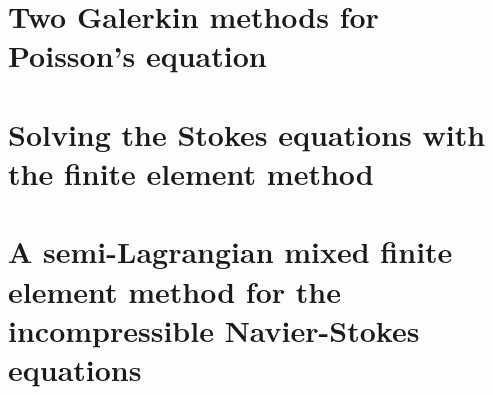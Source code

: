 \documentclass[11pt,a4paper]{memoir}
\begin{document}
\chapter{Two Galerkin methods for Poisson's equation}


\chapter{Solving the Stokes equations with the finite element method}


\chapter{A semi-Lagrangian mixed finite element method for the incompressible Navier-Stokes equations}



\end{document}
